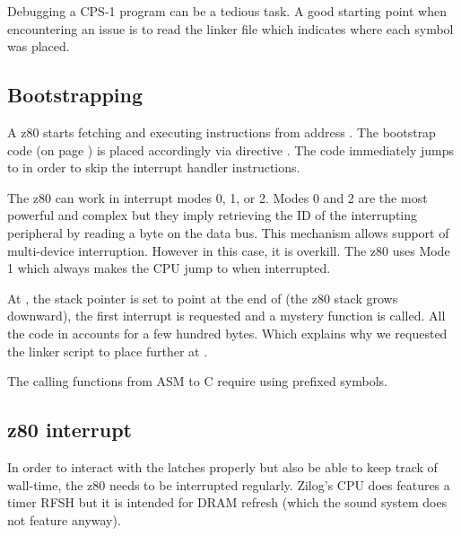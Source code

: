 \begin{trivia}
Debugging a CPS-1 program can be a tedious task. A good starting point when encountering an issue is to read the linker  file which indicates where each symbol was placed.
\end{trivia}

\subsection{Bootstrapping}
A z80 starts fetching and executing instructions from address . The bootstrap code  (on page \pageref{z80_crt0}) is placed accordingly via directive . The code immediately jumps to  in order to skip the interrupt handler instructions. 

The z80 can work in interrupt modes 0, 1, or 2. Modes 0 and 2 are the most powerful and complex but they imply retrieving the ID of the interrupting peripheral by reading a byte on the data bus. This mechanism allows support of multi-device interruption. However in this case, it is overkill. The z80 uses Mode 1 which always makes the CPU jump to  when interrupted.

At , the stack pointer  is set to point at the end of  (the z80 stack grows downward), the first interrupt is requested and a mystery  function is called. All the code in  accounts for a few hundred bytes. Which explains why we requested the linker script to place  further at .

\begin{trivia}
The calling functions from ASM to C require using \icode{\_} prefixed symbols.
\end{trivia}
\pagebreak


\label{z80_crt0}







\subsection{z80 interrupt}
In order to interact with the latches properly but also be able to keep track of wall-time, the z80 needs to be interrupted regularly. Zilog's CPU does features a timer RFSH but it is intended for DRAM refresh (which the sound system does not feature anyway).

